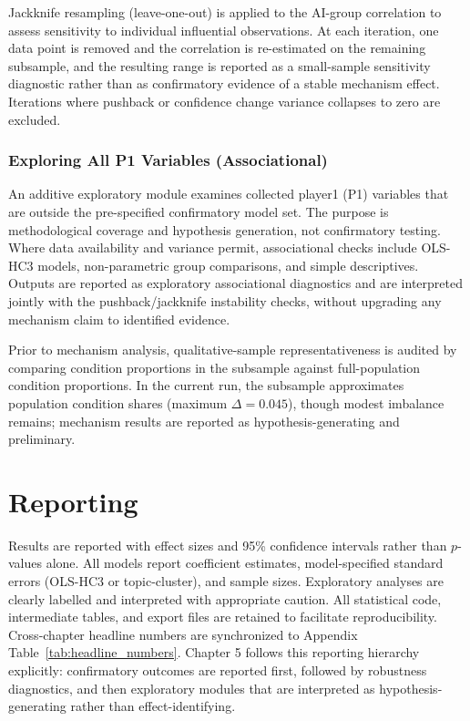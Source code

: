 Jackknife resampling (leave-one-out) is applied to the AI-group
correlation to assess sensitivity to individual influential
observations. At each iteration, one data point is removed and the
correlation is re-estimated on the remaining subsample, and the
resulting range is reported as a small-sample sensitivity diagnostic
rather than as confirmatory evidence of a stable mechanism effect.
Iterations where pushback or confidence
change variance collapses to zero are excluded.

\subsubsection{Exploring All P1 Variables (Associational)}

An additive exploratory module examines collected player1 (P1) variables that
are outside the pre-specified confirmatory model set. The purpose is
methodological coverage and hypothesis generation, not confirmatory testing.
Where data availability and variance permit, associational checks include
OLS-HC3 models, non-parametric group comparisons, and simple descriptives.
Outputs are reported as exploratory associational diagnostics and are interpreted
jointly with the pushback/jackknife instability checks, without upgrading any
mechanism claim to identified evidence.

Prior to mechanism analysis, qualitative-sample representativeness is
audited by comparing condition proportions in the subsample against
full-population condition proportions. In the current run, the
subsample approximates population condition shares (maximum
$\Delta=0.045$), though modest imbalance remains; mechanism results are
reported as hypothesis-generating and preliminary.


\section{Reporting}

Results are reported with effect sizes and 95\% confidence intervals rather
than $p$-values alone. All models report coefficient estimates,
model-specified standard errors (OLS-HC3 or topic-cluster), and sample sizes.
Exploratory analyses are clearly labelled and
interpreted with appropriate caution. All statistical code, intermediate tables,
and export files are retained to facilitate reproducibility. Cross-chapter
headline numbers are synchronized to Appendix Table~\ref{tab:headline_numbers}.
Chapter 5 follows this reporting hierarchy explicitly: confirmatory outcomes are
reported first, followed by robustness diagnostics, and then exploratory modules
that are interpreted as hypothesis-generating rather than effect-identifying.
